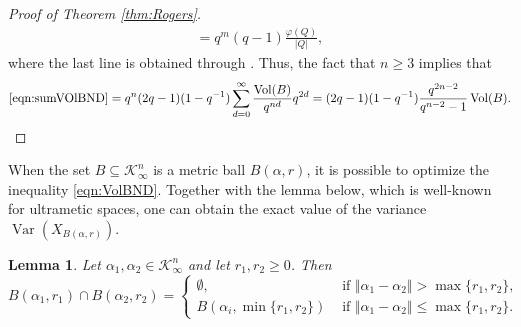 \documentclass[11pt,a4paper,reqno]{amsart}
\newtheorem{lemma}[theorem]{Lemma}
\theoremstyle{definition}
\theoremstyle{remark}
\numberwithin{equation}{section}
\begin{document}
\begin{proof}[Proof of Theorem \ref{thm:Rogers}]
\begin{equation}
\begin{split}
   =q^m(q-1)\frac{\varphi(Q)}{\vert Q\vert},
\end{split}
\end{equation}
where the last line is obtained through \cite[Proposition 1.7]{Ros}. 
Thus, the fact that $n\geq 3$ implies that
\begin{equation}
\begin{split}
\label{eqn:smallA}
\eqref{eqn:sumVOlBND} =q^n(2q-1)(1-q^{-1})\sum_{d=0}^{\infty}\frac{\operatorname{Vol}(B)}{q^{nd}}q^{2d}=(2q-1)(1-q^{-1})\frac{q^{2n-2}}{q^{n-2}-1}\operatorname{Vol}(B).
\end{split}
\end{equation}
\end{proof}
When the set $B\subseteq \mathcal K_\infty^n$ is a metric ball $B(\alpha, r)$, it is possible to optimize the inequality \eqref{eqn:VolBND}. Together with the lemma below, which is well-known for ultrametic spaces, one can obtain the exact value of the variance $\operatorname{Var}(X_{B(\alpha, r)})$. 
\begin{lemma}
\label{lem:UMBalls}
    Let $\alpha_1,\alpha_2\in \mathcal{K}_{\infty}^n$ and let $r_1,r_2\geq 0$. Then 
    $$B(\alpha_1,r_1)\cap B(\alpha_2,r_2)=\begin{cases}
        \emptyset, &\text{ if }\Vert \alpha_1-\alpha_2\Vert>\max\{r_1,r_2\},\\
        B(\alpha_i,\min\{r_1,r_2\})&\text{ if }\Vert \alpha_1-\alpha_2\Vert\leq \max\{r_1,r_2\}.
    \end{cases}$$
\end{lemma}
\end{document}
